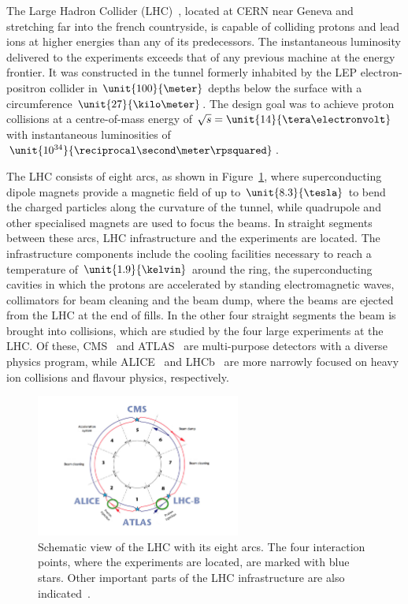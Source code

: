 The Large Hadron Collider (LHC)~\cite{LHC}, located at CERN near Geneva and stretching far into the french countryside, is capable of colliding protons and lead ions at higher energies than any of its predecessors. The instantaneous luminosity delivered to the experiments exceeds that of any previous machine at the energy frontier. It was constructed in the tunnel formerly inhabited by the LEP electron-positron collider in $\unit{100}{\meter}$ depths below the surface with a circumference $\unit{27}{\kilo\meter}$. The design goal was to achieve proton collisions at a centre-of-mass energy of $\sqrt{s} = \unit{14}{\tera\electronvolt}$ with instantaneous luminosities of $\unit{10^{34}}{\reciprocal\second\meter\rpsquared}$. 

The LHC consists of eight arcs, as shown in Figure~\ref{fig:LHC}, where superconducting dipole magnets provide a magnetic field of up to $\unit{8.3}{\tesla}$ to bend the charged particles along the curvature of the tunnel, while quadrupole and other specialised magnets are used to focus the beams. In straight segments between these arcs, LHC infrastructure and the experiments are located. The infrastructure components include the cooling facilities necessary to reach a temperature of $\unit{1.9}{\kelvin}$ around the ring, the superconducting cavities in which the protons are accelerated by standing electromagnetic waves, collimators for beam cleaning and the beam dump, where the beams are ejected from the LHC at the end of fills. In the other four straight segments the beam is brought into collisions, which are studied by the four large experiments at the LHC. Of these, CMS~\cite{CMS} and ATLAS~\cite{ATLAS} are multi-purpose detectors with a diverse physics program, while ALICE~\cite{ALICE} and LHCb~\cite{LHCb} are more narrowly focused on heavy ion collisions and flavour physics, respectively. 

\begin{figure}[htbp]
\centering
  \includegraphics[width=0.6\textwidth]{plots/LHC/LHC_scetch.png}
\caption{Schematic view of the LHC with its eight arcs. The four interaction points, where the experiments are located, are marked with blue stars. Other important parts of the LHC infrastructure are also indicated~\cite{LHCScetch}.}
\label{fig:LHC}
\end{figure}

